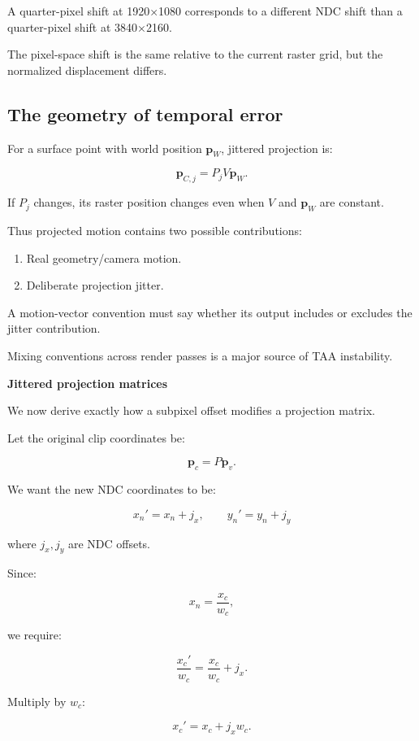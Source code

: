A quarter-pixel shift at 1920×1080 corresponds to a different NDC shift than a quarter-pixel shift at 3840×2160.

The pixel-space shift is the same relative to the current raster grid, but the normalized displacement differs.

\subsection{The geometry of temporal error}\label{02-foundations-ii-ch036-the-geometry-of-temporal-error}

For a surface point with world position \(\mathbf p_W\), jittered projection is:

\[
 \mathbf p_{C,j}=P_jV\mathbf p_W.
\]

If \(P_j\) changes, its raster position changes even when \(V\) and \(\mathbf p_W\) are constant.

Thus projected motion contains two possible contributions:

\begin{enumerate}
\def\labelenumi{\arabic{enumi}.}
\tightlist
\item
  Real geometry/camera motion.
\item
  Deliberate projection jitter.
\end{enumerate}

A motion-vector convention must say whether its output includes or excludes the jitter contribution.

Mixing conventions across render passes is a major source of TAA instability.

\textbf{Jittered projection matrices}

We now derive exactly how a subpixel offset modifies a projection matrix.

Let the original clip coordinates be:

\[
 \mathbf p_c=P\mathbf p_v.
\]

We want the new NDC coordinates to be:

\[
 \boxed{ x_n'=x_n+j_x, \qquad y_n'=y_n+j_y }
\]

where \(j_x,j_y\) are NDC offsets.

Since:

\[
 x_n=\frac{x_c}{w_c},
\]

we require:

\[
 \frac{x_c'}{w_c}= \frac{x_c}{w_c}+j_x.
\]

Multiply by \(w_c\):

\[
 \boxed{x_c'=x_c+j_xw_c}.
\]

